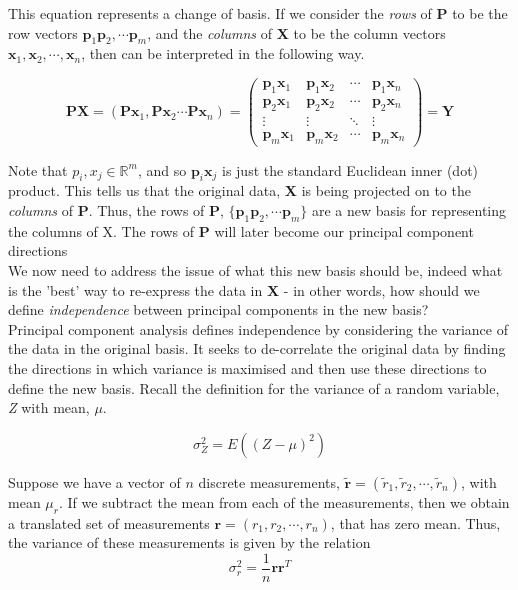 \documentclass[12pt]{article}
\theoremstyle{plain}
\begin{document}
This equation represents a change of basis. If we consider the \emph{rows} of $\textbf{P}$ to be the row vectors $\textbf{p}_1 \textbf{p}_2, \cdots \textbf{p}_m$, and the \emph{columns} of \textbf{X} to be the column vectors $\textbf{x}_1, \textbf{x}_2,\cdots ,\textbf{x}_n$, then can be interpreted in the following way.

\begin{equation}
\textbf{PX} = (\textbf{Px}_1, \textbf{Px}_2 \cdots \textbf{Px}_n) = 
 \begin{pmatrix}
 \textbf{p}_1\textbf{x}_1  & \textbf{p}_1\textbf{x}_2 & \cdots & \textbf{p}_1\textbf{x}_n \\
 \textbf{p}_2\textbf{x}_1  & \textbf{p}_2\textbf{x}_2 & \cdots & \textbf{p}_2\textbf{x}_n \\
  \vdots  & \vdots  & \ddots & \vdots  \\
\textbf{p}_m\textbf{x}_1  & \textbf{p}_m\textbf{x}_2 & \cdots & \textbf{p}_m\textbf{x}_n
 \end{pmatrix}
= \textbf{Y}
\end{equation}


Note that $p_i , x_j \in \mathbb{R}^m$, and so $\textbf{p}_i\textbf{x}_j$ is just the standard Euclidean inner (dot) product. This tells us that the original data, \textbf{X} is being projected on to the \emph{columns} of \textbf{P}. Thus, the rows of \textbf{P}, $\{\textbf{p}_1 \textbf{p}_2, \cdots \textbf{p}_m\}$ are a new basis for representing the columns of X. The rows of \textbf{P} will later become our principal component directions
\\

We now need to address the issue of what this new basis should be, indeed what is the 'best' way to re-express the data in \textbf{X} - in other words, how should we define \emph{independence} between principal components in the new basis?
\\

Principal component analysis defines independence by considering the variance of the data
in the original basis. It seeks to de-correlate the original data by finding the directions in
which variance is maximised and then use these directions to define the new basis. Recall
the definition for the variance of a random variable, \emph{Z} with mean, $\mu$.

\begin{equation}
\sigma_Z^2 = E((Z-\mu)^2)
\end{equation}

Suppose we have a vector of $n$ discrete measurements, $\widetilde{\textbf{r}} = (\widetilde{r}_1, \widetilde{r}_2,\cdots, \widetilde{r}_n)$, with mean $\mu_r$. If we subtract the mean from each of the measurements, then we obtain a translated set of measurements $\textbf{r} = (r_1, r_2, \cdots , r_n)$, that has zero mean. Thus, the variance of these measurements is given by the relation
\begin{equation}
\sigma_r^2 = \frac{1}{n}\textbf{rr}^T
\end{equation}
\end{document}
